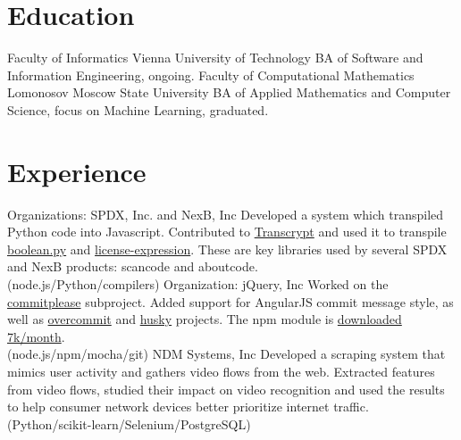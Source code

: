 \documentclass[11pt,a4paper,oneside,roman]{moderncv}
\begin{document}
\makecvtitle

\section{Education}
        {Faculty of Informatics}
        {Vienna University of Technology}
        {}{}
        {BA of Software and Information Engineering, ongoing.}
        {Faculty of Computational Mathematics}
        {Lomonosov Moscow State University}
        {}{}
        {BA of Applied Mathematics and Computer Science, focus on Machine Learning, graduated.}
\section{Experience}
        {Organizations: SPDX, Inc. and NexB, Inc}{}
        {}{Developed a system which transpiled Python code into Javascript. Contributed to \href{https://github.com/all3fox/Transcrypt}{Transcrypt} and used it to transpile \href{https://github.com/all3fox/boolean.py}{boolean.py} and \href{https://github.com/all3fox/license-expression}{license-expression}. These are key libraries used by several SPDX and NexB products: scancode and aboutcode. \\ (node.js/Python/compilers)}
        {Organization: jQuery, Inc}{}
        {}{Worked on the \href{https://github.com/jzaefferer/commitplease/}{commitplease} subproject. Added support for AngularJS commit message style, as well as \href{https://github.com/brigade/overcommit}{overcommit} and \href{https://github.com/typicode/husky}{husky} projects. The npm module is \href{https://www.npmjs.com/package/commitplease}{downloaded 7k/month}. \\ (node.js/npm/mocha/git)}
        {NDM Systems, Inc}
        {}{}
        {Developed a scraping system that mimics user activity and gathers video flows from the web. Extracted features from video flows, studied their impact on video recognition and used the results to help consumer network devices better prioritize internet traffic. \\ (Python/scikit-learn/Selenium/PostgreSQL)}
\end{document}
